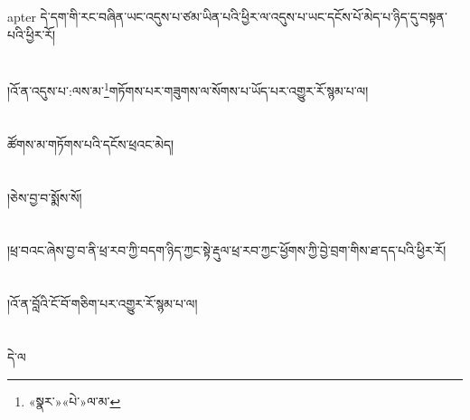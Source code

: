 apter{ }དེ་དག་གི་རང་བཞིན་ཡང་འདུས་པ་ཙམ་ཡིན་པའི་ཕྱིར་ལ་འདུས་པ་ཡང་དངོས་པོ་མེད་པ་ཉིད་དུ་བསྟན་པའི་ཕྱིར་རོ།\chapter{ }།འོ་ན་འདུས་པ་:ལས་མ་\footnote{«སྣར་»«པེ་»ལ་མ་}གཏོགས་པར་གཟུགས་ལ་སོགས་པ་ཡོད་པར་འགྱུར་རོ་སྙམ་པ་ལ།\chapter{ }ཚོགས་མ་གཏོགས་པའི་དངོས་ཕྲའང་མེད།\chapter{ }།ཅེས་བྱ་བ་སྨོས་སོ།\chapter{ }།ཕྲ་བའང་ཞེས་བྱ་བ་ནི་ཕྲ་རབ་ཀྱི་བདག་ཉིད་ཀྱང་སྟེ་རྡུལ་ཕྲ་རབ་ཀྱང་ཕྱོགས་ཀྱི་བྱེ་བྲག་གིས་ཐ་དད་པའི་ཕྱིར་རོ།\chapter{ }།འོ་ན་བློའི་ངོ་བོ་གཅིག་པར་འགྱུར་རོ་སྙམ་པ་ལ།\chapter{ }དེ་ལ
